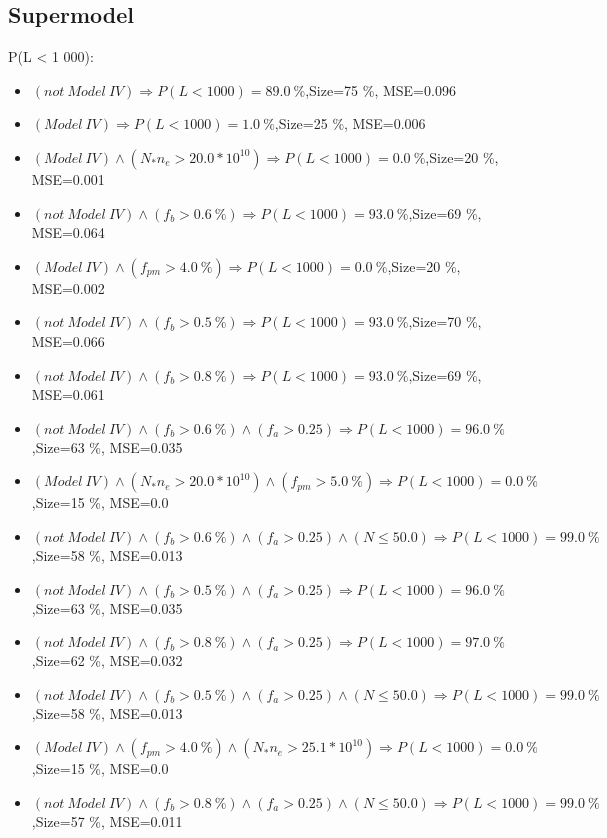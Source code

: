 \documentclass[numbered]{CSL}
\begin{document}
\subsection{Supermodel}
P(L < 1 000):
\begin{itemize}
\item $(not~Model~IV) \Rightarrow P(L < 1 000) = 89.0~\%$,\hfill Size=75 \%, MSE=0.096
\item $(Model~IV) \Rightarrow P(L < 1 000) = 1.0~\%$,\hfill Size=25 \%, MSE=0.006
\item $(Model~IV) \land (N_* n_e > 20.0 * 10^{10}) \Rightarrow P(L < 1 000) = 0.0~\%$,\hfill Size=20 \%, MSE=0.001
\item $(not~Model~IV) \land (f_b > 0.6~\%) \Rightarrow P(L < 1 000) = 93.0~\%$,\hfill Size=69 \%, MSE=0.064
\item $(Model~IV) \land (f_{pm} > 4.0~\%) \Rightarrow P(L < 1 000) = 0.0~\%$,\hfill Size=20 \%, MSE=0.002
\item $(not~Model~IV) \land (f_b > 0.5~\%) \Rightarrow P(L < 1 000) = 93.0~\%$,\hfill Size=70 \%, MSE=0.066
\item $(not~Model~IV) \land (f_b > 0.8~\%) \Rightarrow P(L < 1 000) = 93.0~\%$,\hfill Size=69 \%, MSE=0.061
\item $(not~Model~IV) \land (f_b > 0.6~\%) \land (f_a > 0.25) \Rightarrow P(L < 1 000) = 96.0~\%$,\hfill Size=63 \%, MSE=0.035
\item $(Model~IV) \land (N_* n_e > 20.0 * 10^{10}) \land (f_{pm} > 5.0~\%) \Rightarrow P(L < 1 000) = 0.0~\%$,\hfill Size=15 \%, MSE=0.0
\item $(not~Model~IV) \land (f_b > 0.6~\%) \land (f_a > 0.25) \land (N \leq 50.0) \Rightarrow P(L < 1 000) = 99.0~\%$,\hfill Size=58 \%, MSE=0.013
\item $(not~Model~IV) \land (f_b > 0.5~\%) \land (f_a > 0.25) \Rightarrow P(L < 1 000) = 96.0~\%$,\hfill Size=63 \%, MSE=0.035
\item $(not~Model~IV) \land (f_b > 0.8~\%) \land (f_a > 0.25) \Rightarrow P(L < 1 000) = 97.0~\%$,\hfill Size=62 \%, MSE=0.032
\item $(not~Model~IV) \land (f_b > 0.5~\%) \land (f_a > 0.25) \land (N \leq 50.0) \Rightarrow P(L < 1 000) = 99.0~\%$,\hfill Size=58 \%, MSE=0.013
\item $(Model~IV) \land (f_{pm} > 4.0~\%) \land (N_* n_e > 25.1 * 10^{10}) \Rightarrow P(L < 1 000) = 0.0~\%$,\hfill Size=15 \%, MSE=0.0
\item $(not~Model~IV) \land (f_b > 0.8~\%) \land (f_a > 0.25) \land (N \leq 50.0) \Rightarrow P(L < 1 000) = 99.0~\%$,\hfill Size=57 \%, MSE=0.011

\end{itemize}
\end{document}
